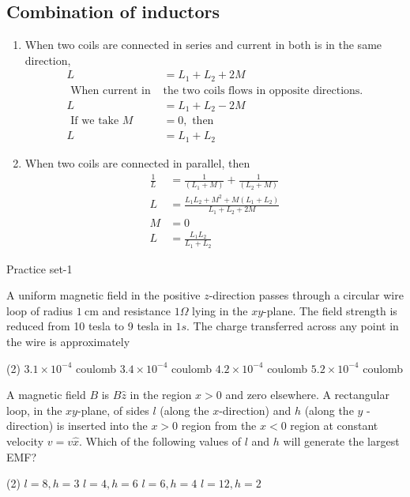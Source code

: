\subsection{Combination of inductors}
\begin{enumerate}
	\item When two coils are connected in series and current in both is in the same direction,
	\begin{align*}
	L&=L_{1}+L_{2}+2 M\\
\text{	When current in }&\text{the two coils flows in opposite directions.}\\
	L&=L_{1}+L_{2}-2 M\\
\text{	If we take }M&=0,\text{ then}\\
	L&=L_{1}+L_{2}
	\end{align*}
		\item When two coils are connected in parallel, then
		\begin{align*}
		\frac{1}{L}&=\frac{1}{\left(L_{1}+M\right)}+\frac{1}{\left(L_{2}+M\right)} \\
		L&=\frac{L_{1} L_{2}+M^{2}+M\left(L_{1}+L_{2}\right)}{L_{1}+L_{2}+2 M}\\
		M&=0\\
		L&=\frac{L_{1} L_{2}}{L_{1}+L_{2}}
		\end{align*}
\end{enumerate}
\newpage
\begin{abox}
	Practice set-1
\end{abox}
\begin{enumerate}
	\begin{minipage}{\textwidth}
		\item A uniform magnetic field in the positive $z$-direction passes through a circular wire loop of radius $1 \mathrm{~cm}$ and resistance $1 \Omega$ lying in the $x y$-plane. The field strength is reduced from 10 tesla to 9 tesla in $1 s$. The charge transferred across any point in the wire is approximately
	\end{minipage}
	\begin{tasks}(2)
		\task[\textbf{A.}]$3.1 \times 10^{-4}$ coulomb
		\task[\textbf{B.}] $3.4 \times 10^{-4}$ coulomb
		\task[\textbf{C.}] $4.2 \times 10^{-4}$ coulomb
		\task[\textbf{D.}]$5.2 \times 10^{-4}$ coulomb
	\end{tasks}
	\begin{minipage}{\textwidth}
		\item A magnetic field $B$ is $B \hat{z}$ in the region $x>0$ and zero elsewhere. A rectangular loop, in the $x y$-plane, of sides $l$ (along the $x$-direction) and $h$ (along the $y$ - direction) is inserted into the $x>0$ region from the $x<0$ region at constant velocity $v=v \hat{x}$. Which of the following values of $l$ and $h$ will generate the largest EMF?
	\end{minipage}
	\begin{tasks}(2)
		\task[\textbf{A.}] $l=8, h=3$
		\task[\textbf{B.}]$l=4, h=6$
		\task[\textbf{C.}]$l=6, h=4$
		\task[\textbf{D.}]$l=12, h=2$
	\end{tasks}
\end{enumerate}

